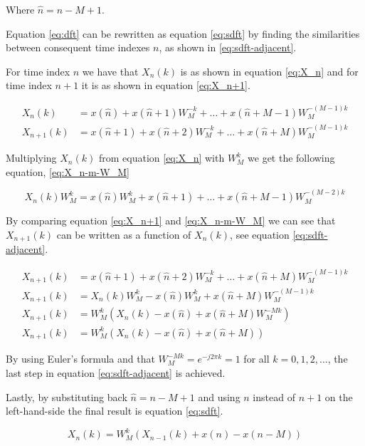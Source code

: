 \documentclass[../main.tex]{subfiles}
\begin{document}
Where $\hat{n} = n - M + 1$.

Equation \eqref{eq:dft} can be rewritten as equation \eqref{eq:sdft} by finding the similarities between consequent time indexes $n$, as shown in \eqref{eq:sdft-adjacent}.

For time index $n$ we have that $X_n(k)$ is as shown in equation \eqref{eq:X_n} and for time index $n+1$ it is as shown in equation \eqref{eq:X_n+1}.

\begin{align}
    X_n(k) &= x(\hat{n}) + x(\hat{n}+1)W_M^{-k} + \ldots + x(\hat{n}+M-1)W_M^{-(M-1)k} \label{eq:X_n}\\
    X_{n+1}(k) &= x(\hat{n}+1) + x(\hat{n}+2)W_M^{-k} + \ldots + x(\hat{n}+M)W_M^{-(M-1)k} \label{eq:X_n+1}
\end{align}

Multiplying $X_n(k)$ from equation \eqref{eq:X_n} with $W_M^{k}$ we get the following equation, \eqref{eq:X_n-m-W_M}

\begin{equation}
    \label{eq:X_n-m-W_M}
    X_n(k)W_M^{k} = x(\hat{n})W_M^{k} + x(\hat{n}+1) + \ldots + x(\hat{n}+M-1)W_M^{-(M-2)k}
\end{equation}

By comparing equation \eqref{eq:X_n+1} and \eqref{eq:X_n-m-W_M} we can see that $X_{n+1}(k)$ can be written as a function of $X_n(k)$, see equation \eqref{eq:sdft-adjacent}.

\begin{align}
    X_{n+1}(k) &= x(\hat{n}+1) + x(\hat{n}+2)W_M^{-k} + \ldots + x(\hat{n}+M)W_M^{-(M-1)k} \nonumber\\
    X_{n+1}(k) &= X_n(k)W_M^{k} - x(\hat{n})W_M^{k} + x(\hat{n}+M)W_M^{-(M-1)k} \nonumber\\
    X_{n+1}(k) &= W_M^{k} ( X_n(k) - x(\hat{n}) + x(\hat{n}+M)W_M^{-Mk} ) \nonumber\\
    X_{n+1}(k) &= W_M^{k} ( X_n(k) - x(\hat{n}) + x(\hat{n}+M) ) \label{eq:sdft-adjacent}
\end{align}

By using Euler's formula and that $W_M^{-Mk} = e^{-j 2 \pi k} = 1$ for all $k = 0,1,2,\ldots$, the last step in equation \eqref{eq:sdft-adjacent} is achieved.

Lastly, by substituting back $\hat{n} = n - M + 1$ and using $n$ instead of $n+1$ on the left-hand-side the final result is equation \eqref{eq:sdft}.

\begin{equation}
    \label{eq:sdft}
    X_n(k) = W_M^{k} (X_{n-1}(k) + x(n) - x(n-M))
\end{equation}
\end{document}
